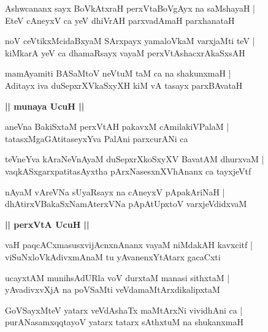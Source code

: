 \documentclass[twoside,12pt,openright]{book}
\newcounter{shloka}[chapter]
\def\uvaca#1{\centerline{{\large\textbf{#1}}}}
\begin{document}
\begin{shloka}%
Ashwcananx sayx BoVkAtxraH perxVtaBoVgAyx na saMshayaH |\\
EteV cAneyxV ca yeV dhiVrAH parxvadAmaH parxhanataH
\end{shloka}

\begin{shloka}%
noV ceVtikxMcidaBxyaM SArxpayx yamaloVkaM varxjaMti teV |\\
kiMkarA yeV ca dhamaRsayx vayaM perxVtAshacxrAkaSxsAH
\end{shloka}

\begin{shloka}%
mamAyamiti BASaMtoV neVtuM taM ca na shakunxmaH |\\
Aditayx iva duSepxrXVkaSxyXH kiM vA tasayx parxBAvataH 
\end{shloka}

\uvaca{|| munaya UcuH ||}

\begin{shloka}%
aneVna BakiSxtaM perxVtAH pakavxM cAmilakiVPalaM |\\
tatasxMgaGAtitaseyxYva PalAni parxcurANi ca 
\end{shloka}

\begin{shloka}%
teVneYva kAraNeVnAyaM duSepxrXkoSxyXV BavatAM dhurxvaM |\\
vaqkASxgarxpatitasAyxtha pArxNasesxnXVhAnanx ca tayxjeVtf 
\end{shloka}

\begin{shloka}%
nAyaM vAreVNa sUyaRsayx na cAneyxV pApakAriNaH |\\
dhAtirxVBakaSxNamAterxVNa pApAtUpxtoV varxjeVdidxvaM 
\end{shloka}

\uvaca{|| perxVtA UcuH ||}

\begin{shloka}%
vaH paqcACxmasusxvijAcnxnAnanx vayaM niMdakAH kavxcitf |\\
viSuNxloVkAdivxmAnaM tu yAvanenxYtAtarx gacaCxti 
\end{shloka}

\begin{shloka}%
ucayxtAM munihsAdURla voV durxtaM manasi sithxtaM |\\
yAvadivxvXjA na poVSaMti veVdamaMtArxdikalipxtaM 
\end{shloka}

\begin{shloka}%
GoVSayxMteV yatarx veVdAshaTx maMtArxNi vividhAni ca |\\
purANasamxqqtayoV yatarx tatarx sAthxtuM na shukanxmaH 
\end{shloka}
\end{document}
